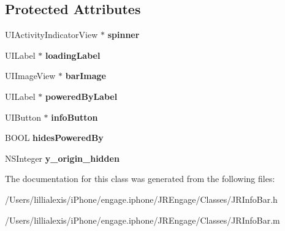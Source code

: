 \subsection*{Protected Attributes}
\begin{DoxyCompactItemize}
\item 
\hypertarget{interface_j_r_info_bar_a491f93366b2d880826ecbc6d4d1e9cf3}{
UIActivityIndicatorView $\ast$ {\bfseries spinner}}
\label{interface_j_r_info_bar_a491f93366b2d880826ecbc6d4d1e9cf3}

\item 
\hypertarget{interface_j_r_info_bar_a3a9d0a7e8f09533b69862f8e0d525c12}{
UILabel $\ast$ {\bfseries loadingLabel}}
\label{interface_j_r_info_bar_a3a9d0a7e8f09533b69862f8e0d525c12}

\item 
\hypertarget{interface_j_r_info_bar_a6d440560233391109c4ca911d18c388f}{
UIImageView $\ast$ {\bfseries barImage}}
\label{interface_j_r_info_bar_a6d440560233391109c4ca911d18c388f}

\item 
\hypertarget{interface_j_r_info_bar_af8fd27a0064bd2bff36314cc0e08cce0}{
UILabel $\ast$ {\bfseries poweredByLabel}}
\label{interface_j_r_info_bar_af8fd27a0064bd2bff36314cc0e08cce0}

\item 
\hypertarget{interface_j_r_info_bar_acf4fe21ccf1f914f5de617d8b67ec11c}{
UIButton $\ast$ {\bfseries infoButton}}
\label{interface_j_r_info_bar_acf4fe21ccf1f914f5de617d8b67ec11c}

\item 
\hypertarget{interface_j_r_info_bar_a2e40235dfbdd3dd38707c0cae64881d5}{
BOOL {\bfseries hidesPoweredBy}}
\label{interface_j_r_info_bar_a2e40235dfbdd3dd38707c0cae64881d5}

\item 
\hypertarget{interface_j_r_info_bar_a51956258eeb80b65bd29b0bb7904b217}{
NSInteger {\bfseries y\_\-origin\_\-hidden}}
\label{interface_j_r_info_bar_a51956258eeb80b65bd29b0bb7904b217}

\end{DoxyCompactItemize}


The documentation for this class was generated from the following files:\begin{DoxyCompactItemize}
\item 
/Users/lillialexis/iPhone/engage.iphone/JREngage/Classes/JRInfoBar.h\item 
/Users/lillialexis/iPhone/engage.iphone/JREngage/Classes/JRInfoBar.m\end{DoxyCompactItemize}
